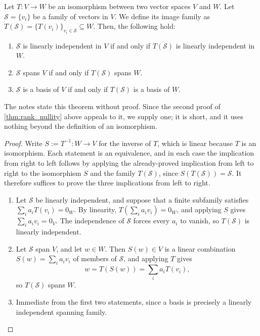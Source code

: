\begin{theorem}
\label{thm:iso_preserves_bases}
Let $T: V \to W$ be an isomorphism between two vector spaces $V$ and $W$. Let $\mathcal{S} = \{v_i\}$ be a family of vectors in $V$. We define its image family as $T(\mathcal{S}) = \{T(v_i)\}_{v_i \in \mathcal{S}} \subseteq W$. Then, the following hold:
\begin{enumerate}
    \item $\mathcal{S}$ is linearly independent in $V$ if and only if $T(\mathcal{S})$ is linearly independent in $W$.
    \item $\mathcal{S}$ spans $V$ if and only if $T(\mathcal{S})$ spans $W$.
    \item $\mathcal{S}$ is a basis of $V$ if and only if $T(\mathcal{S})$ is a basis of $W$.
\end{enumerate}
\end{theorem}

The notes state this theorem without proof. Since the second proof of
\cref{thm:rank_nullity} above appeals to it, we supply one; it is short, and it
uses nothing beyond the definition of an isomorphism.

\begin{proof}
Write $S := T^{-1}: W \to V$ for the inverse of $T$, which is linear because $T$ is an isomorphism. Each statement is an equivalence, and in each case the implication from right to left follows by applying the already-proved implication from left to right to the isomorphism $S$ and the family $T(\mathcal{S})$, since $S(T(\mathcal{S})) = \mathcal{S}$. It therefore suffices to prove the three implications from left to right.

\begin{enumerate}
    \item Let $\mathcal{S}$ be linearly independent, and suppose that a finite subfamily satisfies $\sum_{i} a_i T(v_i) = 0_W$. By linearity, $T\left( \sum_{i} a_i v_i \right) = 0_W$, and applying $S$ gives $\sum_{i} a_i v_i = 0_V$. The independence of $\mathcal{S}$ forces every $a_i$ to vanish, so $T(\mathcal{S})$ is linearly independent.
    \item Let $\mathcal{S}$ span $V$, and let $w \in W$. Then $S(w) \in V$ is a linear combination $S(w) = \sum_{i} a_i v_i$ of members of $\mathcal{S}$, and applying $T$ gives
    \[
    w = T(S(w)) = \sum_{i} a_i T(v_i),
    \]
    so $T(\mathcal{S})$ spans $W$.
    \item Immediate from the first two statements, since a basis is precisely a linearly independent spanning family. \qedhere
\end{enumerate}
\end{proof}

